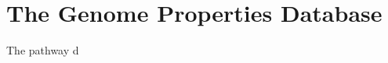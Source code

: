 \chapter{The Genome Properties Database} \label{micromeda-server} \label{genome-properties}

The pathway d